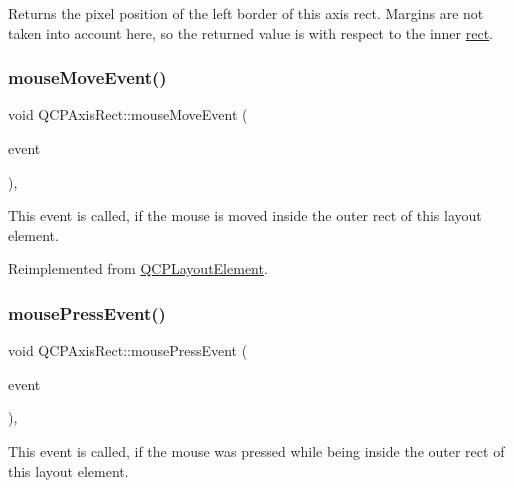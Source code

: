 Returns the pixel position of the left border of this axis rect. Margins are not taken into account here, so the returned value is with respect to the inner \hyperlink{class_q_c_p_layout_element_a208effccfe2cca4a0eaf9393e60f2dd4}{rect}. \hypertarget{class_q_c_p_axis_rect_a4baf3d5dd69166788f6ceda0ea182c6e}{}\label{class_q_c_p_axis_rect_a4baf3d5dd69166788f6ceda0ea182c6e} 
\subsubsection{\texorpdfstring{mouse\+Move\+Event()}{mouseMoveEvent()}}
{\footnotesize\ttfamily void Q\+C\+P\+Axis\+Rect\+::mouse\+Move\+Event (\begin{DoxyParamCaption}\item[{Q\+Mouse\+Event $\ast$}]{event }\end{DoxyParamCaption})\hspace{0.3cm}{\ttfamily [protected]}, {\ttfamily [virtual]}}

This event is called, if the mouse is moved inside the outer rect of this layout element. 

Reimplemented from \hyperlink{class_q_c_p_layout_element_a14f4acf58cdb8dd2c6c571479c4c4a40}{Q\+C\+P\+Layout\+Element}.

\hypertarget{class_q_c_p_axis_rect_a77501dbeccdac7256f7979b05077c04e}{}\label{class_q_c_p_axis_rect_a77501dbeccdac7256f7979b05077c04e} 
\subsubsection{\texorpdfstring{mouse\+Press\+Event()}{mousePressEvent()}}
{\footnotesize\ttfamily void Q\+C\+P\+Axis\+Rect\+::mouse\+Press\+Event (\begin{DoxyParamCaption}\item[{Q\+Mouse\+Event $\ast$}]{event }\end{DoxyParamCaption})\hspace{0.3cm}{\ttfamily [protected]}, {\ttfamily [virtual]}}

This event is called, if the mouse was pressed while being inside the outer rect of this layout element. 

